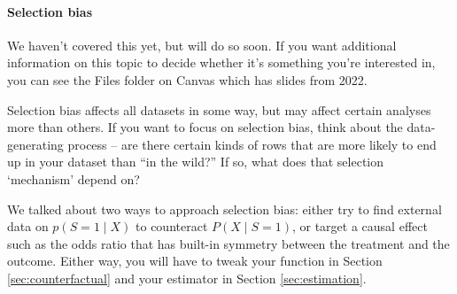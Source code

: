 \documentclass[12pt]{article}
\begin{document}
\paragraph{Selection bias}

We haven't covered this yet, but will do so soon. If you want additional
information on this topic to decide whether it's something you're interested
in, you can see the Files folder on Canvas which has slides from 2022.

Selection bias affects all datasets in some way, but may affect certain analyses
more than others. If you want to focus on selection bias, think about the
data-generating process -- are there certain kinds of rows that are more likely
to end up in your dataset than ``in the wild?'' If so, what does that selection
`mechanism' depend on?

We talked about two ways to approach selection bias: either try to find
external data on $p(S=1 \mid X)$ to counteract $P(X \mid S=1)$, or target a
causal effect such as the odds ratio that has built-in symmetry between the
treatment and the outcome. Either way, you will have to tweak your function
in Section \ref{sec:counterfactual} and your estimator in Section \ref{sec:estimation}.
\end{document}
